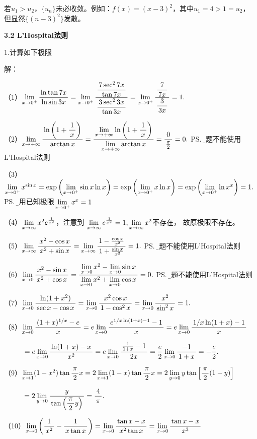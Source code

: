 若$u_1>u_2$，$\{u_n\}$未必收敛。例如：$f(x)=(x-3)^2$，其中$u_1=4>1=u_2$，
但显然$\{(n-3)^2\}$发散。\fin

\begin{center}
	\bf 3.2 L'Hospital法则
\end{center}

\bigskip

1.计算如下极限

解：

（1）$\limx{0^+}\df{\ln\tan 7x}{\ln\sin 3x}
=\limx{0^+}\df{\df{7\sec^27x}{\tan7x}}{\df{3\sec^23x}{\tan3x}}
=\limx{0^+}\df{\df7{7x}}{\df3{3x}}=1.$

（2）$\limx{+\infty}\df{\ln\left(1+\df1x\right)}{\arctan x}
=\df{\limx{+\infty}\ln\left(1+\df1x\right)}{\limx{+\infty}\arctan
x}=\df{0}{\frac{\pi}2}=0.$
\ps{\b 本题不能使用L'Hospital法则}

（3）$\limx{0^+}x^{\sin x}=\exp\left(\limx{0^+}\sin x\ln x\right)
=\exp\left(\limx{0^+}x\ln x\right)=\exp\left(\limx{0^+}\ln x^x\right)
=1.$
\ps{\b 使用已知极限$\limx{0^+}x^x=1$}

（4）$\limx{\infty}x^2e^{\frac1{x^2}}$，注意到
$\limx{\infty}e^{\frac1{x^2}}=1,\limx{\infty}x^2$不存在，
故原极限不存在。

（5）$\limx{\infty}\df{x^2-\cos x}{x^2+\sin x}
=\limx{\infty}\df{1-\frac{\cos x}{x^2}}{1+\frac{\sin x}{x^2}}=1.$
\ps{\b 本题不能使用L'Hospital法则}

（6）$\limx{0}\df{x^2-\sin x}{x^2+\cos x}
=\df{\limx{0}x^2-\limx{0}\sin x}{\limx{0}x^2+\limx{0}\cos x}=0.$
\ps{\b 本题不能使用L'Hospital法则}

（7）$\limx{0}\df{\ln(1+x^2)}{\sec x-\cos x}
=\limx{0}\df{x^2\cos x}{1-\cos^2 x}
=\limx{0}\df{x^2}{\sin^2 x}=1.$

（8）$\limx{0}\df{(1+x)^{1/x}-e}{x}
=e\limx{0}\df{e^{1/x\ln(1+x)-1}-1}{x}
=e\limx{0}\df{1/x\ln(1+x)-1}{x}$

$\hspace{1cm} =e\limx{0}\df{\ln(1+x)-x}{x^2}
=e\limx{0}\df{\frac1{1+x}-1}{2x}
=\frac e2\limx{0}\df{-1}{1+x}=-\frac e2.
$
 
（9）$\limx{1}(1-x^2)\tan\df{\pi}{2}x
=2\limx{1}(1-x)\tan\df{\pi}{2}x
=2\lim\limits_{y\to0}y\tan\left[\df{\pi}2(1-y)\right]$

$\hspace{1cm}
=2\lim\limits_{y\to0}\df y{\tan\left(\df{\pi}2y\right)}
=\df4{\pi}.$
 
（10）$\limx{0}\left(\df 1{x^2}-\df 1{x\tan x}\right)
=\limx{0}\df {\tan x-x}{x^2\tan x}
=\limx{0}\df {\tan x-x}{x^3}$

